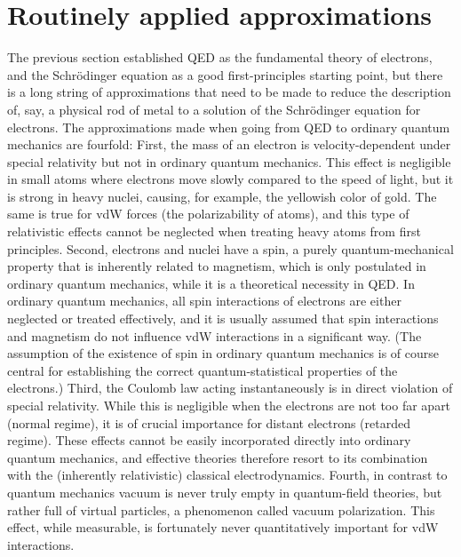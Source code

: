 \section{Routinely applied approximations}

The previous section established QED as the fundamental theory of electrons, and the Schrödinger equation as a good first-principles starting point, but there is a long string of approximations that need to be made to reduce the description of, say, a physical rod of metal to a solution of the Schrödinger equation for electrons.
The approximations made when going from QED to ordinary quantum mechanics are fourfold:
First, the mass of an electron is velocity-dependent under special relativity but not in ordinary quantum mechanics.
This effect is negligible in small atoms where electrons move slowly compared to the speed of light, but it is strong in heavy nuclei, causing, for example, the yellowish color of gold.
The same is true for vdW forces (the polarizability of atoms), and this type of relativistic effects cannot be neglected when treating heavy atoms from first principles.
Second, electrons and nuclei have a spin, a purely quantum-mechanical property that is inherently related to magnetism, which is only postulated in ordinary quantum mechanics, while it is a theoretical necessity in QED\@.
In ordinary quantum mechanics, all spin interactions of electrons are either neglected or treated effectively, and it is usually assumed that spin interactions and magnetism do not influence vdW interactions in a significant way.
(The assumption of the existence of spin in ordinary quantum mechanics is of course central for establishing the correct quantum-statistical properties of the electrons.)
Third, the Coulomb law acting instantaneously is in direct violation of special relativity.
While this is negligible when the electrons are not too far apart (normal regime), it is of crucial importance for distant electrons (retarded regime).
These effects cannot be easily incorporated directly into ordinary quantum mechanics, and effective theories therefore resort to its combination with the (inherently relativistic) classical electrodynamics.
Fourth, in contrast to quantum mechanics vacuum is never truly empty in quantum-field theories, but rather full of virtual particles, a phenomenon called vacuum polarization.
This effect, while measurable, is fortunately never quantitatively important for vdW interactions.

